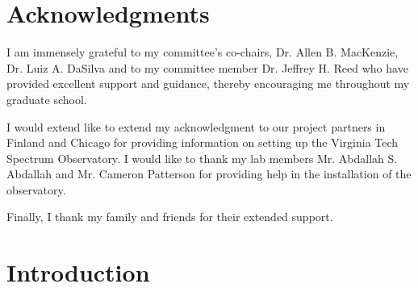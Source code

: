 \documentclass[12pt,sts]{report}
\begin{document}
\vfill

\pagebreak


\tableofcontents

\pagebreak

\listoffigures
\pagebreak

\listoftables
\pagebreak

\section*{Acknowledgments}

I am immensely grateful to my committee's co-chairs, Dr. Allen B. MacKenzie, Dr. Luiz A. DaSilva and to my committee member Dr. Jeffrey H. Reed who have provided excellent support and guidance, thereby encouraging me throughout my graduate school.

I would extend like to extend my acknowledgment to our project partners in Finland and Chicago for providing information on setting up the Virginia Tech Spectrum Observatory. I would like to thank my lab members Mr. Abdallah S. Abdallah and Mr. Cameron Patterson for providing help in the installation of the observatory.

Finally, I thank my family and friends for their extended support.
\pagebreak

\pagestyle{myheadings}

\renewcommand\thesection{\arabic{section}}

\section{Introduction}
\end{document}
